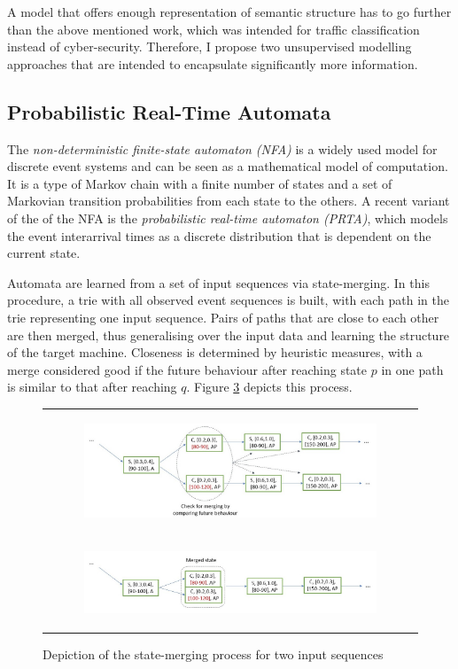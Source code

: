 \documentclass[a4paper,12pt,twoside]{report}
\begin{document}
A model that offers enough representation of semantic structure has to go further than the above mentioned work, which was intended for traffic classification instead of cyber-security. Therefore, I propose two unsupervised modelling approaches that are intended to encapsulate significantly more information.

\subsection{Probabilistic Real-Time Automata}\label{PRTA}

The \textit{non-deterministic finite-state automaton (NFA)} is a widely used model for discrete event systems and can be seen as a mathematical model of computation. It is a type of Markov chain with a finite number of states and a set of Markovian transition probabilities from each state to the others. A recent variant of the  of the NFA is the \textit{probabilistic real-time automaton (PRTA)}, which models the event interarrival times as a discrete distribution that is dependent on the current state. 

Automata are learned from a set of input sequences via state-merging. In this procedure, a trie with all observed event sequences is built, with each path in the trie representing one input sequence. Pairs of paths that are close to each other are then merged, thus generalising over the input data and learning the structure of the target machine. Closeness is determined by heuristic measures, with a merge  considered good if the future behaviour after  reaching state $p$ in one path is  similar to that after reaching $q$. Figure \ref{Autt} depicts this process.


\begin{figure}
\centering
\begin{tabular}{c}
\begin{subfigure}[b]{0.85\textwidth}\label{Autotrie}
\includegraphics[width=\textwidth]{images/Autotrie.jpg}
\caption{}
\end{subfigure}\\
\begin{subfigure}[b]{0.85\textwidth}\label{Automerge}
\includegraphics[width=\textwidth]{images/Automerge.jpg}
\caption{}
\end{subfigure}
\end{tabular}
\caption{Depiction of the state-merging process for two input sequences}\label{Autt}
\end{figure}
\end{document}
